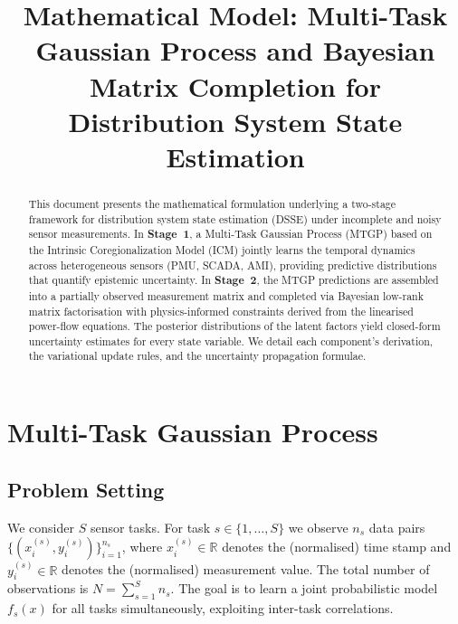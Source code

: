 \documentclass[11pt,a4paper]{article}
\title{Mathematical Model: Multi-Task Gaussian Process and Bayesian Matrix Completion for Distribution System State Estimation}
\author{}
\date{}
\newcommand{\R}{\mathbb{R}}
\begin{document}
\maketitle

\begin{abstract}
This document presents the mathematical formulation underlying a two-stage framework for distribution system state estimation (DSSE) under incomplete and noisy sensor measurements. In \textbf{Stage~1}, a Multi-Task Gaussian Process (MTGP) based on the Intrinsic Coregionalization Model (ICM) jointly learns the temporal dynamics across heterogeneous sensors (PMU, SCADA, AMI), providing predictive distributions that quantify epistemic uncertainty. In \textbf{Stage~2}, the MTGP predictions are assembled into a partially observed measurement matrix and completed via Bayesian low-rank matrix factorisation with physics-informed constraints derived from the linearised power-flow equations. The posterior distributions of the latent factors yield closed-form uncertainty estimates for every state variable. We detail each component's derivation, the variational update rules, and the uncertainty propagation formulae.
\end{abstract}

\section{Multi-Task Gaussian Process}

\subsection{Problem Setting}
We consider $S$ sensor tasks. For task $s \in \{1,\dots,S\}$ we observe $n_s$ data pairs $\{(x_i^{(s)}, y_i^{(s)})\}_{i=1}^{n_s}$, where $x_i^{(s)} \in \R$ denotes the (normalised) time stamp and $y_i^{(s)} \in \R$ denotes the (normalised) measurement value. The total number of observations is $N = \sum_{s=1}^{S} n_s$. The goal is to learn a joint probabilistic model $f_s(x)$ for all tasks simultaneously, exploiting inter-task correlations.
\end{document}
